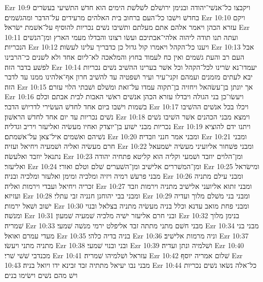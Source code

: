Ezr 10:9  ויקבצו כל־אנשׁי־יהודה ובנימן ירושׁלם לשׁלשׁת הימים הוא חדשׁ התשׁיעי בעשׂרים בחדשׁ וישׁבו כל־העם ברחוב בית האלהים מרעידים על־הדבר ומהגשׁמים׃
Ezr 10:10  ויקם עזרא הכהן ויאמר אלהם אתם מעלתם ותשׁיבו נשׁים נכריות להוסיף על־אשׁמת ישׂראל׃
Ezr 10:11  ועתה תנו תודה ליהוה אלהי־אבתיכם ועשׂו רצונו והבדלו מעמי הארץ ומן־הנשׁים הנכריות׃
Ezr 10:12  ויענו כל־הקהל ויאמרו קול גדול כן כדבריך עלינו לעשׂות׃
Ezr 10:13  אבל העם רב והעת גשׁמים ואין כח לעמוד בחוץ והמלאכה לא־ליום אחד ולא לשׁנים כי־הרבינו לפשׁע בדבר הזה׃
Ezr 10:14  יעמדו־נא שׂרינו לכל־הקהל וכל אשׁר בערינו ההשׁיב נשׁים נכריות יבא לעתים מזמנים ועמהם זקני־עיר ועיר ושׁפטיה עד להשׁיב חרון אף־אלהינו ממנו עד לדבר הזה׃
Ezr 10:15  אך יונתן בן־עשׂהאל ויחזיה בן־תקוה עמדו על־זאת ומשׁלם ושׁבתי הלוי עזרם׃
Ezr 10:16  ויעשׂו־כן בני הגולה ויבדלו עזרא הכהן אנשׁים ראשׁי האבות לבית אבתם וכלם בשׁמות וישׁבו ביום אחד לחדשׁ העשׂירי לדריושׁ הדבר׃
Ezr 10:17  ויכלו בכל אנשׁים ההשׁיבו נשׁים נכריות עד יום אחד לחדשׁ הראשׁון׃
Ezr 10:18  וימצא מבני הכהנים אשׁר השׁיבו נשׁים נכריות מבני ישׁוע בן־יוצדק ואחיו מעשׂיה ואליעזר ויריב וגדליה׃
Ezr 10:19  ויתנו ידם להוציא נשׁיהם ואשׁמים איל־צאן על־אשׁמתם׃
Ezr 10:20  ומבני אמר חנני וזבדיה׃
Ezr 10:21  ומבני חרם מעשׂיה ואליה ושׁמעיה ויחיאל ועזיה׃
Ezr 10:22  ומבני פשׁחור אליועיני מעשׂיה ישׁמעאל נתנאל יוזבד ואלעשׂה׃
Ezr 10:23  ומן־הלוים יוזבד ושׁמעי וקליה הוא קליטא פתחיה יהודה ואליעזר׃
Ezr 10:24  ומן־המשׁררים אלישׁיב ומן־השׁערים שׁלם וטלם ואורי׃
Ezr 10:25  ומישׂראל מבני פרעשׁ רמיה ויזיה ומלכיה ומימן ואלעזר ומלכיה ובניה׃
Ezr 10:26  ומבני עילם מתניה זכריה ויחיאל ועבדי וירמות ואליה׃
Ezr 10:27  ומבני זתוא אליועני אלישׁיב מתניה וירמות וזבד ועזיזא׃
Ezr 10:28  ומבני בבי יהוחנן חנניה זבי עתלי׃
Ezr 10:29  ומבני בני משׁלם מלוך ועדיה ישׁוב ושׁאל ירמות׃
Ezr 10:30  ומבני פחת מואב עדנא וכלל בניה מעשׂיה מתניה בצלאל ובנוי ומנשׁה׃
Ezr 10:31  ובני חרם אליעזר ישׁיה מלכיה שׁמעיה שׁמעון׃
Ezr 10:32  בנימן מלוך שׁמריה׃
Ezr 10:33  מבני חשׁם מתני מתתה זבד אליפלט ירמי מנשׁה שׁמעי׃
Ezr 10:34  מבני בני מעדי עמרם ואואל׃
Ezr 10:35  בניה בדיה כלהי׃
Ezr 10:36  וניה מרמות אלישׁיב׃
Ezr 10:37  מתניה מתני ויעשׂו׃
Ezr 10:38  ובני ובנוי שׁמעי׃
Ezr 10:39  ושׁלמיה ונתן ועדיה׃
Ezr 10:40  מכנדבי שׁשׁי שׁרי׃
Ezr 10:41  עזראל ושׁלמיהו שׁמריה׃
Ezr 10:42  שׁלום אמריה יוסף׃
Ezr 10:43  מבני נבו יעיאל מתתיה זבד זבינא ידו ויואל בניה׃
Ezr 10:44  כל־אלה נשׂאו נשׁים נכריות וישׁ מהם נשׁים וישׂימו בנים׃


